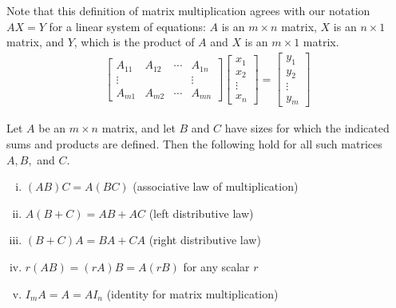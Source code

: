 \documentclass[12pt,letterpaper,reqno]{article}
\numberwithin{equation}{section}
\begin{document}
Note that this definition of matrix multiplication agrees with our notation $AX=Y$ for a linear system of equations: $A$ is an $m \times n$ matrix, $X$ is an $ n \times 1$ matrix, and $Y$, which is the product of $A$ and $X$ is an $m \times 1$ matrix. 
	\begin{align*}
		\begin{bmatrix}
			A_{11} & A_{12} & \cdots & A_{1n} \\
			\vdots & &  & \vdots \\
			A_{m1} & A_{m2} & \cdots & A_{mn}
		\end{bmatrix}\begin{bmatrix}
			x_1 \\ x_2 \\ \vdots \\ x_n
		\end{bmatrix}=\begin{bmatrix}
			y_1 \\ y_2 \\ \vdots \\ y_m
		\end{bmatrix}
	\end{align*}

\begin{thm}\label{thm:properties_of_matrix_multiplication}
	Let $A$ be an $m \times n$ matrix, and let $B$ and $C$ have sizes for which the indicated sums and products are defined. Then the following hold for all such matrices $A,B,$ and $C$.
\begin{enumerate}[(i)]
	\item $(AB)C=A(BC)$ (associative law of multiplication)
	\item $A(B+C)=AB+AC$ (left distributive law)
	\item $(B+C)A=BA+CA$ (right distributive law)
	\item $r(AB)=(rA)B=A(rB)$ for any scalar $r$
	\item $I_mA=A=AI_n$ (identity for matrix multiplication)
\end{enumerate}
\end{thm}
\end{document}
